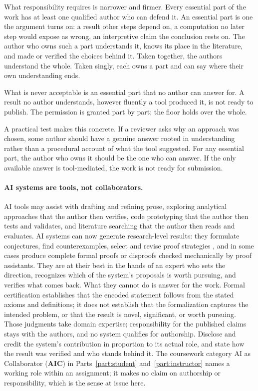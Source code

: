 \documentclass{SIAMbook2023}
\newcommand{\AIC}{\textcolor{catAIC}{\textbf{AIC}}}
\begin{document}
What responsibility requires is narrower and firmer. Every essential part of the work has at least one qualified author who can defend it. An essential part is one the argument turns on: a result other steps depend on, a computation no later step would expose as wrong, an interpretive claim the conclusion rests on. The author who owns such a part understands it, knows its place in the literature, and made or verified the choices behind it. Taken together, the authors understand the whole. Taken singly, each owns a part and can say where their own understanding ends.

What is never acceptable is an essential part that no author can answer for. A result no author understands, however fluently a tool produced it, is not ready to publish. The permission is granted part by part; the floor holds over the whole.

A practical test makes this concrete. If a reviewer asks why an approach was chosen, some author should have a genuine answer rooted in understanding rather than a procedural account of what the tool suggested. For any essential part, the author who owns it should be the one who can answer. If the only available answer is tool-mediated, the work is not ready for submission.

\paragraph{AI systems are tools, not collaborators.}
AI tools may assist with drafting and refining prose, exploring analytical approaches that the author then verifies, code prototyping that the author then tests and validates, and literature searching that the author then reads and evaluates. AI systems can now generate research-level results: they formulate conjectures, find counterexamples, select and revise proof strategies \citep{an2026qed}, and in some cases produce complete formal proofs or disproofs checked mechanically by proof assistants. They are at their best in the hands of an expert who sets the direction, recognizes which of the system's proposals is worth pursuing, and verifies what comes back. What they cannot do is answer for the work. Formal certification establishes that the encoded statement follows from the stated axioms and definitions; it does not establish that the formalization captures the intended problem, or that the result is novel, significant, or worth pursuing. Those judgments take domain expertise; responsibility for the published claims stays with the authors, and no system qualifies for authorship. Disclose and credit the system's contribution in proportion to its actual role, and state how the result was verified and who stands behind it. The coursework category AI as Collaborator (\AIC{}) in Parts~\ref{part:student} and~\ref{part:instructor} names a working role within an assignment; it makes no claim on authorship or responsibility, which is the sense at issue here.
\end{document}

